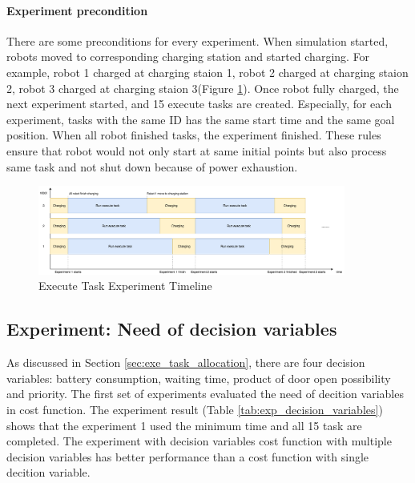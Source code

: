 \paragraph{Experiment precondition}
There are some preconditions for every experiment. When simulation started, robots moved to corresponding charging station and started charging. For example, robot 1 charged at charging staion 1, robot 2 charged at charging staion 2, robot 3 charged at charging staion 3(Figure \ref{fig:execute_task_experiment_timeline}). 
Once robot fully charged, the next experiment started, and 15 execute tasks are created. Especially, for each experiment, tasks with the same ID has the same start time and the same goal position. When all robot finished tasks, the experiment finished.
These rules ensure that robot would not only start at same initial points but also process same task and not shut down because of power exhaustion.

\begin{figure}[htbp]
    \centering
    \includegraphics[width = 0.9\textwidth]{content/images/ch5/exe_exp_timeline.drawio.png}
    \caption{Execute Task Experiment Timeline}
    \label{fig:execute_task_experiment_timeline}
\end{figure}

\subsection{Experiment: Need of decision variables}
As discussed in Section \ref{sec:exe_task_allocation}, there are four decision variables: battery consumption, waiting time, product of door open possibility and priority. 
The first set of experiments evaluated the need of decition variables in cost function. 
The experiment result (Table \ref{tab:exp_decision_variables}) shows that the experiment 1 used the minimum time and all 15 task are completed.
The experiment with decision variables cost function with multiple decision variables has better performance than a cost function with single decition variable.

